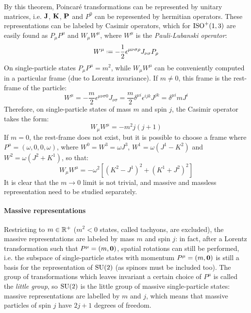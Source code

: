 By this theorem, Poincaré transformations can be represented by unitary matrices, i.e. $ \mathbf{J} $, $ \mathbf{K} $, $ \mathbf{P} $ and $ P^0 $ can be represented by hermitian operators. These representations can be labeled by Casimir operators, which for $ \mathrm{ISO}^+(1,3) $ are easily found as $ P_\mu P^\mu $ and $ W_\mu W^\mu $, where $ W^\mu $ is the \textit{Pauli-Lubanski operator}:
\begin{equation}
  W^\mu \defeq -\frac{1}{2} \epsilon^{\mu \nu \sigma \rho} J_{\nu \sigma} P_\rho
\end{equation}
On single-particle states $ P_\mu P^\mu = m^2 $, while $ W_\mu W^\mu $ can be conveniently computed in a particular frame (due to Lorentz invariance). If $ m \neq 0 $, this frame is the rest-frame of the particle:
\begin{equation*}
  W^\mu = - \frac{m}{2} \epsilon^{\mu \nu \sigma 0} J_{\nu \sigma} = \frac{m}{2} \delta^{\mu i} \epsilon^{ijk} J^{jk} = \delta^{\mu i} m J^i
\end{equation*}
Therefore, on single-particle states of mass $ m $ and spin $ j $, the Casimir operator takes the form:
\begin{equation}
  W_\mu W^\mu = - m^2 j \left( j + 1 \right)
\end{equation}
If $ m = 0 $, the rest-frame does not exist, but it is possible to choose a frame where $ P^\mu = (\omega,0,0,\omega) $, where $ W^0 = W^3 = \omega J^3 $, $ W^1 = \omega \left( J^1 - K^2 \right) $ and $ W^2 = \omega \left( J^2 + K^1 \right) $, so that:
\begin{equation}
  W_\mu W^\mu = - \omega^2 \left[ \left( K^2 - J^1 \right)^2 + \left( K^1 + J^2 \right)^2 \right]
\end{equation}
It is clear that the $ m \rightarrow 0 $ limit is not trivial, and massive and massless representation need to be studied separately.

\paragraph{Massive representations}

Restricting to $ m \in \mathbb{R}^+ $ ($ m^2 < 0 $ states, called tachyons, are excluded), the massive representations are labeled by mass $ m $ and spin $ j $: in fact, after a Lorentz transformation such that $ P^\mu = (m,\mathbf{0}) $, spatial rotations can still be performed, i.e. the subspace of single-particle states with momentum $ P^\mu = (m,\mathbf{0}) $ is still a basis for the representation of $ \mathrm{SU}(2) $ (as spinors must be included too). The group of transformations which leaves invariant a certain choice of $ P^\mu $ is called the \textit{little group}, so $ \mathrm{SU}(2) $ is the little group of massive single-particle states: massive representations are labelled by $ m $ and $ j $, which means that massive particles of spin $ j $ have $ 2j + 1 $ degrees of freedom.

